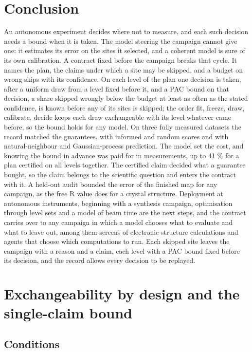 \documentclass{iopjournal}
\begin{document}
\hypertarget{sec:7}{%
\section{Conclusion}\label{sec:7}}

An autonomous experiment decides where not to measure, and each such decision needs a bound when it is taken. The model steering the campaign cannot give one: it estimates its error on the sites it selected, and a coherent model is sure of its own calibration. A contract fixed before the campaign breaks that cycle. It names the plan, the claims under which a site may be skipped, and a budget on wrong skips with its confidence. On each level of the plan one decision is taken, after a uniform draw from a level fixed before it, and a PAC bound on that decision, a share skipped wrongly below the budget at least as often as the stated confidence, is known before any of its sites is skipped; the order fit, freeze, draw, calibrate, decide keeps each draw exchangeable with its level whatever came before, so the bound holds for any model. On three fully measured datasets the record matched the guarantees, with informed and random scores and with natural-neighbour and Gaussian-process prediction. The model set the cost, and knowing the bound in advance was paid for in measurements, up to 41 \% for a plan certified on all levels together. The certified claim decided what a guarantee bought, so the claim belongs to the scientific question and enters the contract with it. A held-out audit bounded the error of the finished map for any campaign, as the free R value does for a crystal structure. Deployment at autonomous instruments, beginning with a synthesis campaign, optimisation through level sets and a model of beam time are the next steps, and the contract carries over to any campaign in which a model chooses what to evaluate and what to leave out, among them screens of electronic-structure calculations and agents that choose which computations to run. Each skipped site leaves the campaign with a reason and a claim, each level with a PAC bound fixed before its decision, and the record allows every decision to be replayed.


\appendix
\hypertarget{app:A}{%
\section{Exchangeability by design and the single-claim bound}\label{app:A}}

\hypertarget{conditions}{%
\subsection{Conditions}\label{conditions}}
\end{document}
